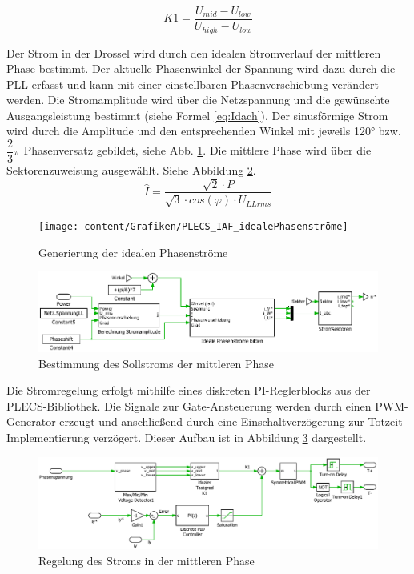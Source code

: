 		
		\begin{equation}
			\label{eq:K1}
			K1 = \dfrac{U_{mid}- U_{low}}{U_{high} -U_{low}} 
		\end{equation}
		
			Der Strom in der Drossel wird durch den idealen Stromverlauf der mittleren Phase bestimmt. Der aktuelle Phasenwinkel der Spannung wird dazu durch die PLL erfasst und kann mit einer einstellbaren Phasenverschiebung verändert werden. Die Stromamplitude wird über die Netzspannung und die gewünschte Ausgangsleistung bestimmt (siehe Formel \ref{eq:Idach}). Der sinusförmige Strom wird durch die Amplitude und den entsprechenden Winkel mit jeweils 120° bzw. $\dfrac{2}{3}\pi$ Phasenversatz gebildet, siehe Abb. \ref{fig:plecsiafidealephasenstrome}. Die mittlere Phase wird über die Sektorenzuweisung ausgewählt. Siehe Abbildung \ref{fig:plecsiafiy}.
			\begin{equation}
				\label{eq:Idach}
				\hat{I} = \dfrac{\sqrt{2} \cdot P   }{ \sqrt{3} \cdot cos(\varphi) \cdot  U_{LLrms} }
			\end{equation}
		\begin{figure}
			\centering
			\texttt{[image: content/Grafiken/PLECS\_IAF\_idealePhasenströme]}
			\caption{Generierung der idealen Phasenströme}
			\label{fig:plecsiafidealephasenstrome}
		\end{figure}
		
		
		\begin{figure}
			\centering
			\includegraphics[width=1\linewidth]{content/Grafiken/PlecsIAFiy}
			\caption{Bestimmung des Sollstroms der mittleren Phase}
			\label{fig:plecsiafiy}
		\end{figure}
		
Die Stromregelung erfolgt mithilfe eines diskreten PI-Reglerblocks aus der PLECS-Bibliothek. Die Signale zur Gate-Ansteuerung werden durch einen PWM-Generator erzeugt und anschließend durch eine Einschaltverzögerung zur Totzeit-Implementierung verzögert. Dieser Aufbau ist in Abbildung \ref{fig:plecsiafivsk1} dargestellt. 
		\begin{figure}
			\centering
			\includegraphics[width=1\linewidth]{content/Grafiken/PlecsIAFivsK1}
			\caption{Regelung des Stroms in der mittleren Phase}
			\label{fig:plecsiafivsk1}
		\end{figure}
		
